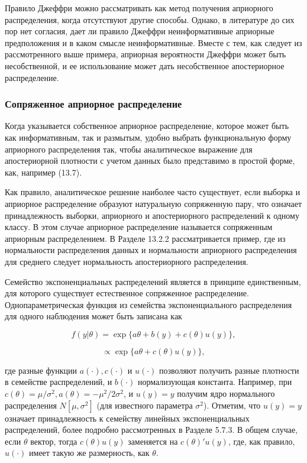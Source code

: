 Правило Джеффри  можно рассматривать как метод получения априорного распределения, когда отсутствуют другие способы. Однако, в литературе до сих пор нет согласия, дает ли правило Джеффри неинформативные априорные предположения и в каком смысле неинформативные. Вместе с тем, как следует из рассмотренного выше примера, априорная вероятности Джеффри может быть несобственной, и ее использование может дать несобственное апостериорное распределение.

\subsubsection*{Сопряженное априорное распределение}

Когда указывается собственное априорное распределение, которое может быть как информативным, так и размытым, удобно выбрать функциональную форму априорного распределения так, чтобы аналитическое выражение для апостериорной плотности с учетом данных было представимо в простой форме, как, например (13.7).

Как правило, аналитическое решение наиболее часто существует, если выборка и априорное распределение образуют натуральную сопряженную пару, что означает принадлежность выборки, априорного и апостериорного распределений к одному классу. В этом случае априорное распределение называется сопряженным априорным распределением. В Разделе 13.2.2 рассматривается пример, где из нормальности распределения данных и нормальности априорного распределения для среднего следует нормальность апостериорного распределения.

Семейство экспоненциальных распределений является в принципе единственным, для которого существует естественное сопряженное распределение. Однопараметрическая функция из семейства экспоненциального распределения для одного наблюдения может быть записана как

\begin{equation}
f(y|\theta)=\exp\lbrace{a\theta+b(y)+c(\theta)u(y)}\rbrace,
\end{equation}

\[
{\propto}\exp\lbrace{a\theta+c(\theta)u(y)}\rbrace,
\]

где разные функции $a(\cdot), c(\cdot)$ и $u(\cdot)$ позволяют получить разные плотности в семействе распределений, и $b(\cdot)$ нормализующая константа. Например, при $c(\theta)=\mu/\sigma^{2}, a(\theta)=-\mu^{2}/2\sigma^{2}$, и $u(y)=y$ получим ядро нормального распределения $N[\mu,\sigma^{2}]$ (для известного параметра $\sigma^{2}$). Отметим, что $u(y)=y$ означает принадлежность к семейству линейных экспоненциальных распределений, более подробно рассмотренных в Разделе 5.7.3. В общем случае, если $\theta$ вектор, тогда $c(\theta)u(y)$ заменяется на $c(\theta)'u(y)$, где, как правило, $u(\cdot)$ имеет такую же размерность, как $\theta$.

